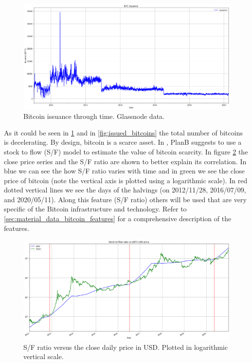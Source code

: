 \begin{figure}[!htb]
    \centering
    \includegraphics[width=\textwidth]{introduction/images/issuance.png}
    \caption{Bitcoin issuance through time. Glassnode data.}
    \label{fig:issuance}
\end{figure}

As it could be seen in \ref{fig:issuance} and in  \ref{fig:issued_bitcoins} the total number of bitcoins is decelerating. By design, bitcoin is a scarce asset. In \cite{bitcoin_stock_to_flow}, PlanB suggests to use a stock to flow (S/F) model to estimate the value of bitcoin scarcity. In figure \ref{fig:stock_to_flow} the close price series and the S/F ratio are shown to better explain its correlation. In blue we can see the how S/F ratio varies with time and in green we see the close price of bitcoin (note the vertical axis is plotted using a logarithmic scale). In red dotted vertical lines we see the days of the halvings (on 2012/11/28, 2016/07/09, and 2020/05/11). Along this feature (S/F ratio) others will be used that are very specific of the Bitcoin infrastructure and technology. Refer to \ref{sec:material_data_bitcoin_features} for a comprehensive description of the features.

\begin{figure}[!htb]
    \centering
    \includegraphics[width=\textwidth]{introduction/images/stock-to-flow.png}
    \caption{S/F ratio versus the close daily price in USD. Plotted in logarithmic vertical scale.}
    \label{fig:stock_to_flow}
\end{figure}

